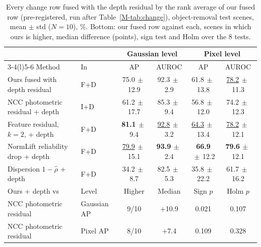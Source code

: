 \documentclass[journal]{IEEEtran}
\begin{document}
\begin{table}[t]
\centering
\caption{Every change row fused with the depth residual by the rank average of our fused row (pre-registered, run after Table~\ref{M-tab:change}), object-removal test scenes, mean $\pm$ std ($N=10$), \%. Bottom: our fused row against each, scenes in which ours is higher, median difference (points), sign test and Holm over the 8 tests.}
\label{tab:fused}
\footnotesize
\setlength{\tabcolsep}{5pt}
\begin{tabular}{@{}llcccc@{}}
\toprule
& & \multicolumn{2}{c}{Gaussian level} & \multicolumn{2}{c}{Pixel level}\\
\cmidrule(lr){3-4}\cmidrule(l){5-6}
Method & In & AP & AUROC & AP & AUROC\\
\midrule
Ours fused with depth residual & F+D & 75.0{\scriptsize$\,\pm\,$12.9} & 92.3{\scriptsize$\,\pm\,$2.9} & 61.8{\scriptsize$\,\pm\,$13.8} & \underline{78.2}{\scriptsize$\,\pm\,$11.3}\\
NCC photometric residual + depth & I+D & 61.2{\scriptsize$\,\pm\,$17.7} & 85.3{\scriptsize$\,\pm\,$9.4} & 56.8{\scriptsize$\,\pm\,$12.0} & 74.2{\scriptsize$\,\pm\,$12.3}\\
Feature residual, $k=2$, + depth & F+D & \textbf{81.1}{\scriptsize$\,\pm\,$9.4} & \underline{92.8}{\scriptsize$\,\pm\,$3.2} & \underline{64.3}{\scriptsize$\,\pm\,$13.4} & \underline{78.2}{\scriptsize$\,\pm\,$12.1}\\
NormLift reliability drop + depth & F+D & \underline{79.9}{\scriptsize$\,\pm\,$15.1} & \textbf{93.9}{\scriptsize$\,\pm\,$2.4} & \textbf{66.9}{\scriptsize$\,\pm\,$12.2} & \textbf{79.6}{\scriptsize$\,\pm\,$12.1}\\
Dispersion $1-\hat\rho$ + depth & F+D & 34.2{\scriptsize$\,\pm\,$8.7} & 82.5{\scriptsize$\,\pm\,$5.3} & 35.8{\scriptsize$\,\pm\,$22.2} & 61.7{\scriptsize$\,\pm\,$16.2}\\
\midrule
Ours + depth vs & Level & Higher & Median & Sign $p$ & Holm $p$\\
\midrule
NCC photometric residual & Gaussian AP & 9/10 & +10.9 & 0.021 & 0.107\\
NCC photometric residual & Pixel AP & 8/10 & +7.4 & 0.109 & 0.328\\

\end{tabular}
\end{table}
\end{document}
